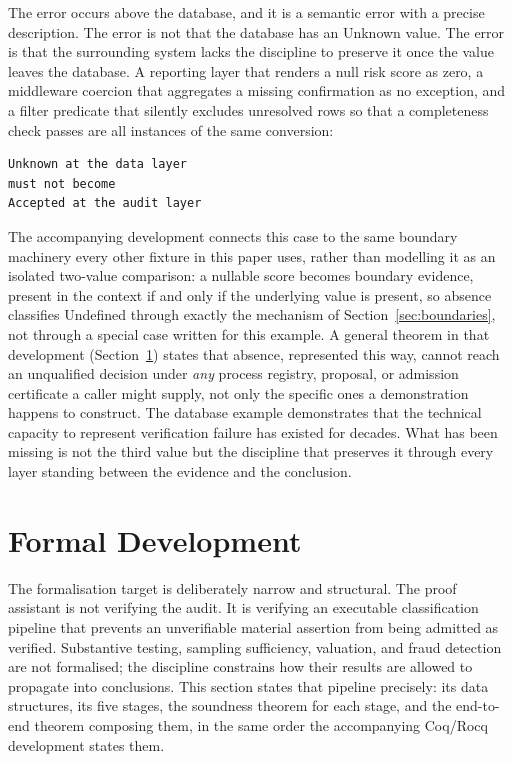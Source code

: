 \documentclass[smallcondensed,envcountsect,natbib]{svjour3}
\newcommand{\state}[1]{\textsf{#1}}
\begin{document}
The error occurs above the database, and it is a semantic error with a precise description. The error is not that the database has an \state{Unknown} value. The error is that the surrounding system lacks the discipline to preserve it once the value leaves the database. A reporting layer that renders a null risk score as zero, a middleware coercion that aggregates a missing confirmation as no exception, and a filter predicate that silently excludes unresolved rows so that a completeness check passes are all instances of the same conversion:

\begin{lstlisting}
Unknown at the data layer
must not become
Accepted at the audit layer
\end{lstlisting}

The accompanying development connects this case to the same boundary machinery every other fixture in this paper uses, rather than modelling it as an isolated two-value comparison: a nullable score becomes boundary evidence, present in the context if and only if the underlying value is present, so absence classifies \state{Undefined} through exactly the mechanism of Section~\ref{sec:boundaries}, not through a special case written for this example. A general theorem in that development (Section~\ref{sec:formal}) states that absence, represented this way, cannot reach an unqualified decision under \emph{any} process registry, proposal, or admission certificate a caller might supply, not only the specific ones a demonstration happens to construct. The database example demonstrates that the technical capacity to represent verification failure has existed for decades. What has been missing is not the third value but the discipline that preserves it through every layer standing between the evidence and the conclusion.

\section{Formal Development}
\label{sec:formal}

The formalisation target is deliberately narrow and structural. The proof assistant is not verifying the audit. It is verifying an executable classification pipeline that prevents an unverifiable material assertion from being admitted as verified. Substantive testing, sampling sufficiency, valuation, and fraud detection are not formalised; the discipline constrains how their results are allowed to propagate into conclusions. This section states that pipeline precisely: its data structures, its five stages, the soundness theorem for each stage, and the end-to-end theorem composing them, in the same order the accompanying Coq/Rocq development states them.
\end{document}
